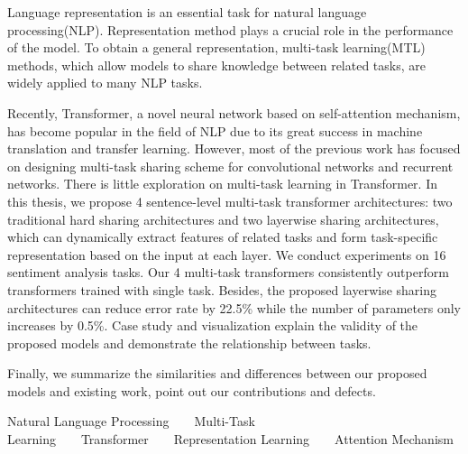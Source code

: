 \begin{eabstract}
	Language representation is an essential task for natural language processing(NLP). Representation method plays a crucial role in the performance of the model. To obtain a general representation, multi-task learning(MTL) methods, which allow models to share knowledge between related tasks, are widely applied to many NLP tasks.
	
	Recently, Transformer, a novel neural network based on self-attention mechanism, has become popular in the field of NLP due to its great success in machine translation and transfer learning. However, most of the previous work has focused on designing multi-task sharing scheme for convolutional networks and recurrent networks. There is little exploration on multi-task learning in Transformer. In this thesis, we propose 4 sentence-level multi-task transformer architectures: two traditional hard sharing architectures and two layerwise sharing architectures, which can dynamically extract features of related tasks and form task-specific representation based on the input at each layer. We conduct experiments on 16 sentiment analysis tasks. Our 4 multi-task transformers consistently outperform transformers trained with single task. Besides, the proposed layerwise sharing architectures can reduce error rate by 22.5\% while the number of parameters only increases by 0.5\%. Case study and visualization explain the validity of the proposed models and demonstrate the relationship between tasks.
	
	Finally, we summarize the similarities and differences between our proposed models and existing work, point out our contributions and defects.
	
\end{eabstract}


\begin{ekeywords}
	Natural Language Processing\ \ \ \ Multi-Task Learning\ \ \ \ Transformer\ \ \ \ Representation Learning\ \ \ \ Attention Mechanism
\end{ekeywords}

